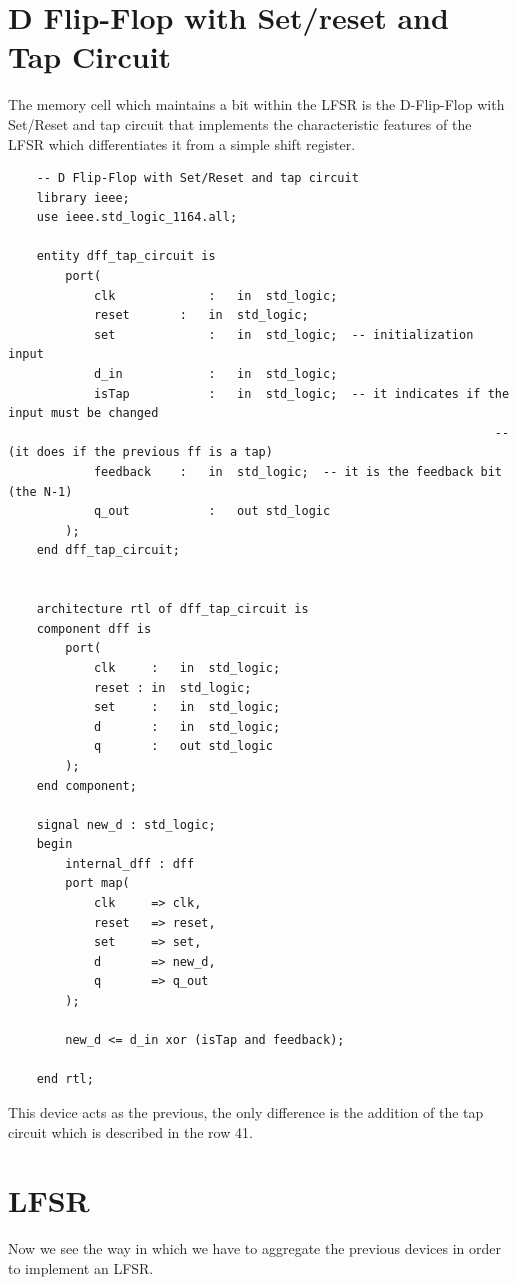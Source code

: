 \documentclass[a4paper]{report}
\begin{document}
\section{D Flip-Flop with Set/reset and Tap Circuit}
The memory cell which maintains a bit within the LFSR is the D-Flip-Flop with Set/Reset and tap circuit that implements the characteristic features of the LFSR which differentiates it from a simple shift register.
\begin{lstlisting}
	-- D Flip-Flop with Set/Reset and tap circuit
	library ieee;
	use ieee.std_logic_1164.all;
	
	entity dff_tap_circuit is
		port(
			clk				:	in 	std_logic;
			reset 		:	in 	std_logic;
			set				:	in 	std_logic;  -- initialization input
			d_in			:	in 	std_logic;	
			isTap			:	in 	std_logic;	-- it indicates if the input must be changed
																	-- (it does if the previous ff is a tap)
			feedback	:	in 	std_logic;  -- it is the feedback bit (the N-1)
			q_out			:	out std_logic
		);
	end dff_tap_circuit;
	
	
	architecture rtl of dff_tap_circuit is
	component dff is
		port(
			clk		:	in 	std_logic;
			reset :	in 	std_logic;
			set		:	in 	std_logic;
			d 		:	in 	std_logic;
			q 		:	out std_logic
		);
	end component;
	
	signal new_d : std_logic;
	begin
		internal_dff : dff
		port map(
			clk 	=> clk,
			reset	=> reset,
			set 	=> set,
			d 		=> new_d,
			q 		=> q_out
		);
		
		new_d <= d_in xor (isTap and feedback);
	
	end rtl;
\end{lstlisting}
This device acts as the previous, the only difference is the addition of the tap circuit which is described in the row 41.

\section{LFSR}
Now we see the way in which we have to aggregate the previous devices in order to implement an LFSR.
\end{document}
